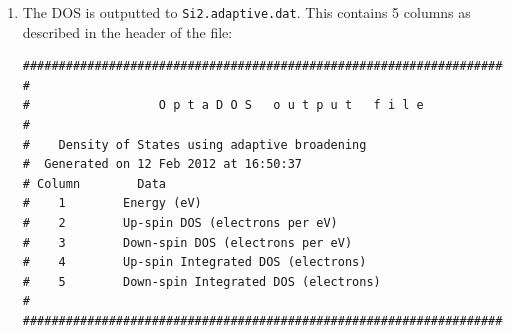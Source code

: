 \documentclass[a4paper,11pt,twoside]{book}
\begin{document}
{\begin{enumerate}
Since we had \verb#efermi : optados#, \optados\ sets the internal value of the Fermi level to the one it has derived from the DOS. This is important for subsequent calculations. Other valid options are \verb#file#, where \optados\ uses the value calculated by the electronic structure code that generated the eigenvalues;  \verb#insulator#, where \optados\ uses a value calculated from assuming the system is non-metallic; or a value set by the user.

\optados\ now performs some analysis of the DOS at the Fermi level,
\begin{verbatim}
+----------------------- DOS at Fermi Energy Analysis ------------------------+
|                          Fermi energy used :   5.4109 eV                    |
| From Adaptive broadening                                                    |
|   Spin Component : 1   DOS at Fermi Energy :   0.0011 eln/cell       <- DEA |
|   Spin Component : 2   DOS at Fermi Energy :   0.0011 eln/cell       <- DEA |
+-----------------------------------------------------------------------------+
\end{verbatim}
From this we may assume that there is a band gap.

Importantly, then \optados\ calculates the band energy from the DOS is has calculated.
\begin{verbatim}
+--------------------------- Band Energy Analysis ----------------------------+
|          Band energy (Adaptive broadening) :       1.3609 eV         <- BEA |
|                  Band energy (From CASTEP) :       1.3622 eV         <- BEC |
+-----------------------------------------------------------------------------+
\end{verbatim}
As the quality of the \optados\ calculation is increased these two values should converge to the same answer.

Finally \optados\ shifts the Fermi level to 0\,eV, for the output files.

\item  The DOS is outputted to {\tt Si2.adaptive.dat}. This contains 5 columns as described in the header of the file:
\begin{verbatim}
########################################################################
#
#                  O p t a D O S   o u t p u t   f i l e 
#
#    Density of States using adaptive broadening
#  Generated on 12 Feb 2012 at 16:50:37 
# Column        Data
#    1        Energy (eV)
#    2        Up-spin DOS (electrons per eV)
#    3        Down-spin DOS (electrons per eV)
#    4        Up-spin Integrated DOS (electrons)
#    5        Down-spin Integrated DOS (electrons)
#
########################################################################
\end{verbatim}


\end{enumerate}}
\end{document}
